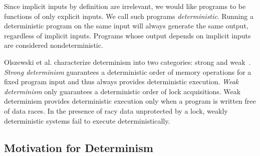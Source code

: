 Since implicit inputs by definition are irrelevant, we would like programs to be
functions of only explicit inputs. We call such programs \emph{deterministic}.
Running a deterministic program on the same input will always generate the same
output, regardless of implicit inputs. Programs whose output depends on
implicit inputs are considered nondeterministic.

Olszewski et al. characterize determinism into two categories: strong and
weak~\cite{olszewski2009kendo}. \emph{Strong determinism} guarantees a
deterministic order of memory operations for a fixed program input and thus
always provides deterministic execution. \emph{Weak determinism} only guarantees
a deterministic order of lock acquisitions. Weak determinism provides
deterministic execution only when a program is written free of data races. In
the presence of racy data unprotected by a lock, weakly deterministic systems
fail to execute deterministically.

\iffalse
\paragraph{A New Programming Model}
\fi

\iffalse

Parallel programming languages, like DPJ~\cite{bocchino2009type}, provide
deterministic execution; however, since these languages require rewriting
existing programs and have limited potential for wide uptake, we shall not
consider such systems. We also will not consider systems that require
specialized hardware like DMP~\cite{Devietti09}.
We would like a deterministic environment that runs on standard
computer hardware written in popular, convention programming languages like C.

We focus on systems that run programs deterministically written in conventional
languages, like C. Kendo is a weakly deterministic runtime
library~\cite{olszewski2009kendo} for C++ applications.
CoreDet\~cite{bergan2010coredet} provides strong determinism via a compiler
and runtime library.

Even though we consider some inputs to be nondeterministic (like
{\tt gettimeofday()}), these inputs are often semantically relevant to a
program. Thus, we focus our efforts on nondeterministic implicit inputs.

\fi

\subsection{Motivation for Determinism}

